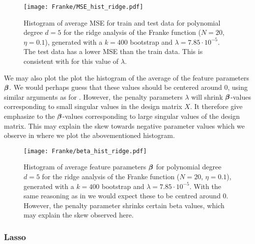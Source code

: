         \begin{figure}
            \texttt{[image: Franke/MSE\_hist\_ridge.pdf]}
            \caption{Histogram of average MSE for train and test data for polynomial degree $d=5$ for the ridge analysis of the Franke function ($N=20$, $\eta=0.1$), generated with a $k=400$ bootstrap and $\lambda=7.85\cdot 10^{-5}$. The test data has a lower MSE than the train data. This is consistent with  for this value of $\lambda$.}
            \label{fig:mse_hist_ridge}
        \end{figure}

        We may also plot the plot the histogram of the average of the feature parameters $\boldsymbol{\beta}$. We would perhaps guess that these values should be centered around 0, using similar arguments as for . However, the penalty parameters $\lambda$ will shrink $\boldsymbol{\beta}$-values corresponding to small singular values in the design matrix $X$. It therefore give emphasize to the $\boldsymbol{\beta}$-values corresponding to large singular values of the design matrix. This may explain the skew towards negative parameter values which we observe in  where we plot the abovementioned histogram. 
        \begin{figure}
            \texttt{[image: Franke/beta\_hist\_ridge.pdf]} 
            \caption{Histogram of average feature parameters $\boldsymbol{\beta}$ for polynomial degree $d=5$ for the ridge analysis of the Franke function ($N=20$, $\eta=0.1$), generated with a $k=400$ bootstrap and $\lambda=7.85\cdot 10^{-5}$. With the same reasoning as in  we would expect these to be centred around 0. However, the penalty parameter shrinks certain beta values, which may explain the skew observed here.}
            \label{fig:beta_hist_ridge}
        \end{figure}











        \subsubsection{Lasso}\label{sec:lassoanalysis}

